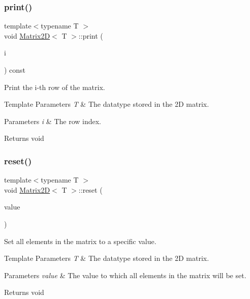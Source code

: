 \subsubsection{\texorpdfstring{print()}{print()}}
{\footnotesize\ttfamily template$<$typename T $>$ \\
void \mbox{\hyperlink{classMatrix2D}{Matrix2D}}$<$ T $>$\+::print (\begin{DoxyParamCaption}\item[{int}]{i }\end{DoxyParamCaption}) const}



Print the i-\/th row of the matrix. 


\begin{DoxyTemplParams}{Template Parameters}
{\em T} & The datatype stored in the 2D matrix. \\
\hline
\end{DoxyTemplParams}

\begin{DoxyParams}{Parameters}
{\em i} & The row index.\\
\hline
\end{DoxyParams}
\begin{DoxyReturn}{Returns}
void 
\end{DoxyReturn}
\mbox{\label{classMatrix2D_a1a646829a2e9d166e0e47439de633b95}} 
\subsubsection{\texorpdfstring{reset()}{reset()}}
{\footnotesize\ttfamily template$<$typename T $>$ \\
void \mbox{\hyperlink{classMatrix2D}{Matrix2D}}$<$ T $>$\+::reset (\begin{DoxyParamCaption}\item[{T}]{value }\end{DoxyParamCaption})}



Set all elements in the matrix to a specific value. 


\begin{DoxyTemplParams}{Template Parameters}
{\em T} & The datatype stored in the 2D matrix. \\
\hline
\end{DoxyTemplParams}

\begin{DoxyParams}{Parameters}
{\em value} & The value to which all elements in the matrix will be set.\\
\hline
\end{DoxyParams}
\begin{DoxyReturn}{Returns}
void 
\end{DoxyReturn}
\mbox{\label{classMatrix2D_a28515c515652637734a22a3440e80258}} 
